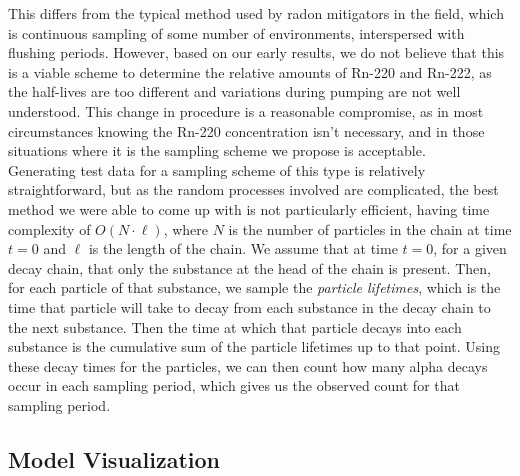 \documentclass[11pt]{m2pi}
\begin{document}
This differs from the typical method used by radon mitigators in the field, which is continuous sampling of some number of environments, interspersed with flushing periods. However, based on our early results, we do not believe that this is a viable scheme to determine the relative amounts of Rn-220 and Rn-222, as the half-lives are too different and variations during pumping are not well understood. This change in procedure is a reasonable compromise, as in most circumstances knowing the Rn-220 concentration isn't necessary, and in those situations where it is the sampling scheme we propose is acceptable. \\

Generating test data for a sampling scheme of this type is relatively straightforward, but as the random processes involved are complicated, the best method we were able to come up with is not particularly efficient, having time complexity of $O(N\cdot \ell)$, where $N$ is the number of particles in the chain at time $t=0$ and $\ell$ is the length of the chain. We assume that at time $t=0$, for a given decay chain, that only the substance at the head of the chain is present. Then, for each particle of that substance, we sample the \textit{particle lifetimes}, which is the time that particle will take to decay from each substance in the decay chain to the next substance. Then the time at which that particle decays into each substance is the cumulative sum of the particle lifetimes up to that point. Using these decay times for the particles, we can then count how many alpha decays occur in each sampling period, which gives us the observed count for that sampling period.\\

\subsection{Model Visualization}\label{SS:ModelVisualization}
\end{document}
